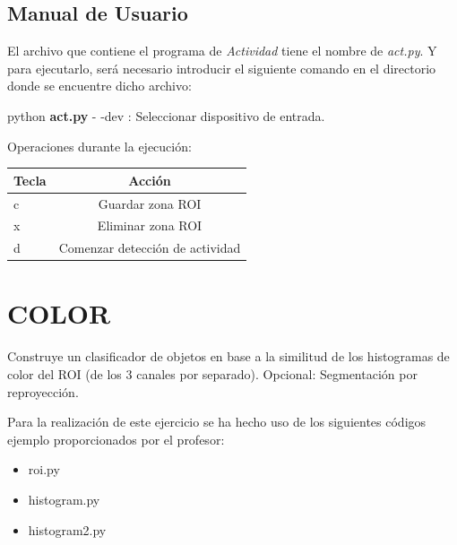 \documentclass[a4paper]{article} %
\begin{document}
\subsection*{Manual de Usuario}

El archivo que contiene el programa de \textit{Actividad} tiene el nombre de \textit{act.py}. Y para ejecutarlo, será necesario introducir el siguiente comando en el directorio donde se encuentre dicho archivo:
\\
\begin{tcolorbox}[collower=red!75!black]
python \textbf{act.py}
\tcblower
- -dev : Seleccionar dispositivo de entrada.
\end{tcolorbox}

Operaciones durante la ejecución:

\begin{center}
    \begin{tabular}{ l | c }
      Tecla & Acción \\ \hline
      c & Guardar zona ROI \\
      x & Eliminar zona ROI \\
      d & Comenzar detección de actividad \\
    \end{tabular}
\end{center}

\newpage


\section{COLOR}
\bigskip

\begin{tcolorbox}[breakable,notitle,boxrule=0pt,colback=lightgray,colframe=lightgray]
Construye un clasificador de objetos en base a la similitud de los histogramas de color del ROI (de los 3 canales por separado). Opcional: Segmentación por reproyección.
\end{tcolorbox}

Para la realización de este ejercicio se ha hecho uso de los siguientes códigos ejemplo proporcionados por el profesor:

\begin{itemize}
  \item roi.py
  \item histogram.py
  \item histogram2.py
\end{itemize}
\end{document}
